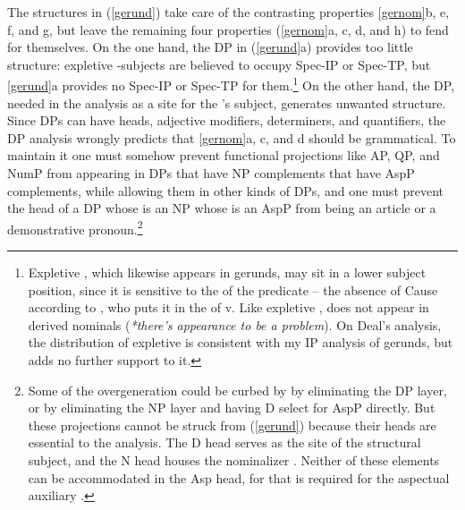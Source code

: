 \documentclass[output=paper,
modfonts
]{LSP/langsci}
\newcommand{\rf}[1]{(\ref{#1})}
\newcommand{\rfa}[2]{(\ref{#1}{#2})}
\begin{document}
\largerpage[-1]    
The structures in \rf{gerund} take care of the contrasting properties \cref{gernom}{b}, {e}, {f}, and {g}, but leave the remaining four properties
(\cref{gernom}{a}, {c}, {d}, and {h}) to fend for
themselves.  On the one hand, the DP in \rfa{gerund}{a} provides too little structure:
expletive -subjects are believed to occupy Spec-IP or Spec-TP, but \cref{gerund}{a}
provides no Spec-IP or Spec-TP for them.\footnote{Expletive , which likewise
  appears in gerunds, may sit in a lower subject position, since it is sensitive to the
   of the predicate – the absence of Cause according to \citealt{deal2009}, who puts
  it in the  of v.  Like expletive ,  does not appear in
  derived nominals (\textit{*there's appearance to be a problem}).  On Deal's analysis, the
  distribution of expletive  is consistent with my IP analysis of gerunds, but
  adds no further support to it.} On the other hand, the DP, needed in the analysis as a site
for the 's subject, generates unwanted structure.  Since DPs can have  heads,
adjective modifiers, determiners, and quantifiers, the DP analysis wrongly predicts that
\cref{gernom}{a}, {c}, and {d} should be grammatical.  To maintain it
one must somehow prevent functional projections like AP, QP, and NumP from appearing in DPs
that have NP complements that have AspP complements, while allowing them in other kinds of DPs,
and one must prevent the head of a DP whose  is an NP whose  is an AspP
from being an article or a demonstrative pronoun.\footnote{Some of the overgeneration could be
  curbed by by eliminating the DP layer, or by eliminating the NP layer and having D select for
  AspP directly. But these projections cannot be struck from \rf{gerund} because their heads
  are essential to the analysis.  The D head serves as the site of the structural subject, and
  the N head houses the nominalizer .  Neither of these elements can be
  accommodated in the Asp head, for that is required for the aspectual auxiliary
  .}
\end{document}
